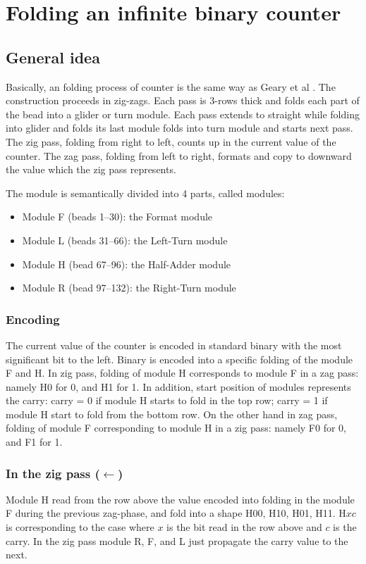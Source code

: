 \documentclass[runningheads]{llncs}
\begin{document}
\section{Folding an infinite binary counter}

\subsection{General idea}
Basically, an folding process of counter is the same way as Geary et al \cite{counter2016}.
The construction proceeds in zig-zags.
Each pass is 3-rows thick and folds each part of the bead into a glider or turn module.
Each pass extends to straight while folding into glider and folds its last module folds into turn module and starts next pass.
The zig pass, folding from right to left, counts up in the current value of the counter.
The zag pass, folding from left to right, formats and copy to downward the value which the zig pass represents.

The module is semantically divided into 4 parts, called modules:
\begin{itemize}
\item Module F (beads 1--30): the Format module
\item Module L (beads 31--66): the Left-Turn module
\item Module H (bead 67--96): the Half-Adder module
\item Module R (bead 97--132): the Right-Turn module 
\end{itemize}

\subsubsection{Encoding}
The current value of the counter is encoded in standard binary with the most significant bit to the left.
Binary is encoded into a specific folding of the module F and H.
In zig pass, folding of module H corresponds to module F in a zag pass: namely H0 for 0, and H1 for 1.
In addition, start position of modules represents the carry: carry = 0 if module H starts to fold in the top row; carry = 1 if module H start to fold from the bottom row.
On the other hand in zag pass, folding of module F corresponding to module H in a zig pass: namely F0 for 0, and F1 for 1.

\subsubsection{In the zig pass ($\leftarrow$)}
Module H read from the row above the value encoded into folding in the module F during the previous zag-phase, and fold into a shape H00, H10, H01, H11.
H$xc$ is corresponding to the case where $x$ is the bit read in the row above and $c$ is the carry. 
In the zig pass module R, F, and L just propagate the carry value to the next.
\end{document}
